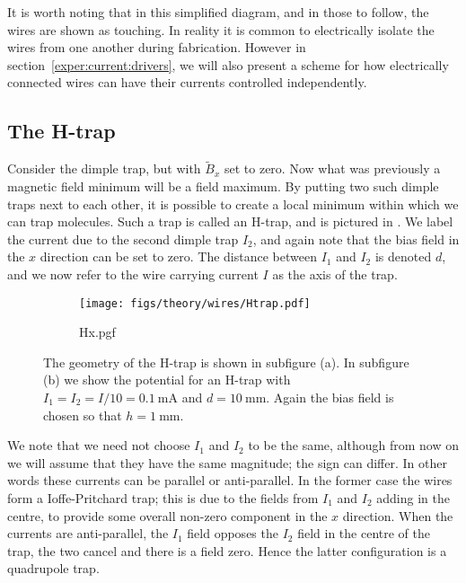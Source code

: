 It is worth noting that in this simplified diagram, and in those to follow, the
wires are shown as touching. In reality it is common to electrically isolate
the wires from one another during fabrication. However in
section~\ref{exper:current:drivers}, we
will also present a scheme for how electrically connected wires can have their
currents controlled independently.

\subsection{The H-trap}

Consider the dimple trap, but with $\tilde{B}_x$ set to zero. Now what was
previously a magnetic field minimum will be a field maximum. By putting two
such dimple traps next to each other, it is possible to create a local minimum
within which we can trap molecules. Such a trap is called an H-trap, and is
pictured in . We label the current due to the second
dimple trap $I_2$, and again note that the bias field in the $x$ direction can
be set to zero. The distance between $I_1$ and $I_2$ is denoted $d$, and we now
refer to the wire carrying current $I$ as the axis of the trap.

\begin{figure}[htb]
  \centering
  \begin{subfigure}[b]{0.4\textwidth}
    \texttt{[image: figs/theory/wires/Htrap.pdf]}
  \end{subfigure}
  \begin{subfigure}[b]{0.4\textwidth}
    {Hx.pgf}
  \end{subfigure}
  \caption[H-trap]{The geometry of the H-trap is shown in subfigure (a). In subfigure
  (b) we show the potential for an H-trap with
  $I_1=I_2=I/10=\SI{0.1}{\milli\ampere}$ and $d=\SI{10}{\milli\meter}$. Again the bias field is chosen so
  that $h=\SI{1}{\milli\meter}$.}
  \label{theory:fig:Htrap}
\end{figure}

We note that we need not choose $I_1$ and $I_2$ to be the same, although from
now on we will assume that they have the same magnitude; the sign can differ.
In other words these currents can be parallel or anti-parallel. In the former
case the wires form a Ioffe-Pritchard trap; this is due to the fields from
$I_1$ and $I_2$ adding in the centre, to provide some overall non-zero
component in the $x$ direction. When the currents are anti-parallel, the $I_1$
field opposes the $I_2$ field in the centre of the trap, the two cancel and
there is a field zero. Hence the latter configuration is a quadrupole trap.

